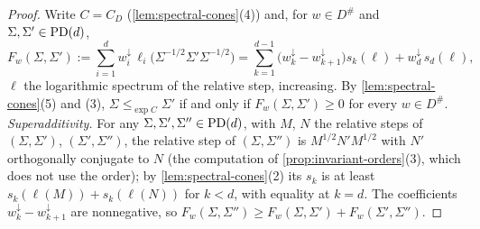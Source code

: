 \begin{proof}
\leanok
Write $C = C_D$ (\ref{lem:spectral-cones}(4)) and, for $w \in D^\#$ and $\Sigma, \Sigma' \in \mathrm{PD}(d)$,
\[
  F_w(\Sigma, \Sigma') := \sum_{i=1}^dw^\downarrow_i\,\ell_i\bigl(\Sigma^{-1/2}\Sigma'\Sigma^{-1/2}\bigr)
  = \sum_{k=1}^{d-1}\bigl(w^\downarrow_k - w^\downarrow_{k+1}\bigr)s_k(\ell) + w^\downarrow_d\,s_d(\ell) ,
\]
$\ell$ the logarithmic spectrum of the relative step, increasing. By \ref{lem:spectral-cones}(5) and (3),
$\Sigma \le_{\exp C} \Sigma'$ if and only if $F_w(\Sigma, \Sigma') \ge 0$ for every $w \in D^\#$.
\emph{Superadditivity.} For any $\Sigma, \Sigma', \Sigma'' \in \mathrm{PD}(d)$, with $M$, $N$ the relative steps of
$(\Sigma, \Sigma')$, $(\Sigma', \Sigma'')$, the relative step of $(\Sigma, \Sigma'')$ is
$M^{1/2}N'M^{1/2}$ with $N'$ orthogonally conjugate to $N$ (the computation of
\ref{prop:invariant-orders}(3), which does not use the order); by \ref{lem:spectral-cones}(2) its $s_k$ is
at least $s_k(\ell(M)) + s_k(\ell(N))$ for $k < d$, with equality at $k = d$. The coefficients
$w^\downarrow_k - w^\downarrow_{k+1}$ are nonnegative, so
$F_w(\Sigma, \Sigma'') \ge F_w(\Sigma, \Sigma') + F_w(\Sigma', \Sigma'')$.


\end{proof}
